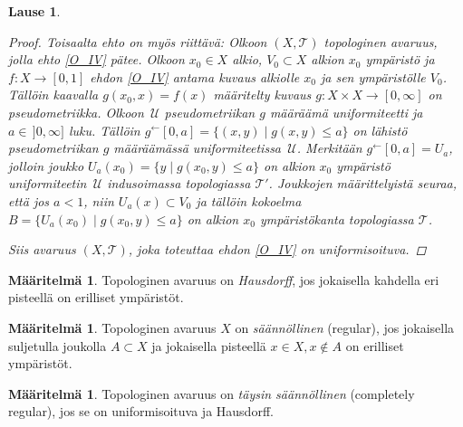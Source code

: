 \documentclass[12pt,a4paper,leqno]{report}
\newcommand{\U}{\,\mathcal{U}}
\newcommand{\T}{\mathcal{T}}
\theoremstyle{plain}
\newtheorem{lause}[equation]{Lause}
\theoremstyle{definition}
\newtheorem{maar}[equation]{Määritelmä}
\theoremstyle{remark}
\begin{document}
\begin{lause}
\begin{proof}
Toisaalta ehto on myös riittävä:
Olkoon $(X,\T)$ topologinen avaruus, jolla ehto \ref{O_IV} pätee. 
Olkoon $x_0\in X$ alkio, $V_0\subset X$ alkion $x_0$ ympäristö 
ja $f\colon X\rightarrow [0,1]$ ehdon \ref{O_IV} antama kuvaus alkiolle $x_0$ ja sen ympäristölle $V_0$. 
Tällöin kaavalla $g(x_0,x)=f(x)$ määritelty kuvaus $g\colon X\times X\to [0,\infty]$ on pseudometriikka. 
Olkoon $\U$ pseudometriikan $g$ määräämä uniformiteetti ja 
$ a\in \,]0,\infty]$ luku. 
Tällöin $g^\leftarrow[0,a]=\{(x,y)\mid g(x,y)\leq a\}$ on 
lähistö pseudometriikan $g$ määräämässä uniformiteetissa $\U$. 
Merkitään $g^\leftarrow[0,a]=U_a$, jolloin  
joukko $U_a(x_0)=\{y\mid g(x_0,y)\leq a\}$ on alkion $x_0$ ympäristö uniformiteetin $\U$ 
indusoimassa topologiassa $\T'$. 
Joukkojen määrittelyistä seuraa, että jos $a<1$, niin $U_a(x)\subset V_0$ ja tällöin kokoelma $B=\{U_a(x_0)\mid g(x_0,y)\leq a\}$ 
on alkion $x_0$ ympäristökanta topologiassa $\T$.
%

Siis avaruus $(X,\T)$, joka toteuttaa ehdon \ref{O_IV} on uniformisoituva.
\end{proof}
\end{lause}

\begin{maar}
Topologinen avaruus on \emph{Hausdorff}, jos jokaisella kahdella eri pisteellä on erilliset ympäristöt.
\end{maar}

\begin{maar}
Topologinen avaruus $X$ on \emph{säännöllinen} (regular), 
jos jokaisella suljetulla joukolla $A\subset X$ ja jokaisella pisteellä $x\in X,x\not\in A$ on erilliset ympäristöt.
\end{maar}

\begin{maar}
Topologinen avaruus on \emph{täysin säännöllinen} (completely regular), 
jos se on uniformisoituva ja Hausdorff.
\end{maar}
\end{document}
